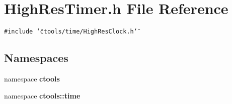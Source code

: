 \section{High\-Res\-Timer.h File Reference}
\label{HighResTimer_8h}
{\tt \#include \char`\"{}ctools/time/High\-Res\-Clock.h\char`\"{}}\par
\subsection*{Namespaces}
\begin{CompactItemize}
\item 
namespace {\bf ctools}
\item 
namespace {\bf ctools::time}
\end{CompactItemize}
